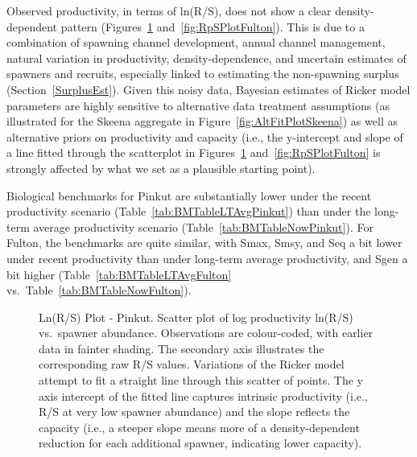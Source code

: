 \documentclass[french,11pt]{book}
\begin{document}
Observed productivity, in terms of ln(R/S), does not show a clear density-dependent pattern (Figures~\ref{fig:RpSPlotPinkut} and~\ref{fig:RpSPlotFulton}). This is due to a combination of spawning channel development, annual channel management, natural variation in productivity, density-dependence, and uncertain estimates of spawners and recruits, especially linked to estimating the non-spawning surplus (Section~\ref{SurplusEst}). Given this noisy data, Bayesian estimates of Ricker model parameters are highly sensitive to alternative data treatment assumptions (as illustrated for the Skeena aggregate in Figure~\ref{fig:AltFitPlotSkeena}) as well as alternative priors on productivity and capacity (i.e., the y-intercept and slope of a line fitted through the scatterplot in Figures~\ref{fig:RpSPlotPinkut} and~\ref{fig:RpSPlotFulton} is strongly affected by what we set as a plausible starting point).

Biological benchmarks for Pinkut are substantially lower under the recent productivity scenario (Table~\ref{tab:BMTableLTAvgPinkut}) than under the long-term average productivity scenario (Table~\ref{tab:BMTableNowPinkut}). For Fulton, the benchmarks are quite similar, with Smax, Smsy, and Seq a bit lower under recent productivity than under long-term average productivity, and Sgen a bit higher (Table~\ref{tab:BMTableLTAvgFulton} vs.~Table~\ref{tab:BMTableNowFulton}).

\clearpage


\begin{figure}[htb]

{\centering {} 

}

\caption{Ln(R/S) Plot - Pinkut. Scatter plot of log productivity ln(R/S) vs.~spawner abundance. Observations are colour-coded, with earlier data in fainter shading. The secondary axis illustrates the corresponding raw R/S values. Variations of the Ricker model attempt to fit a straight line through this scatter of points. The y axis intercept of the fitted line captures intrinsic productivity (i.e., R/S at very low spawner abundance) and the slope reflects the capacity (i.e., a steeper slope means more of a density-dependent reduction for each additional spawner, indicating lower capacity).}\label{fig:RpSPlotPinkut}
\end{figure}
\clearpage
\end{document}
